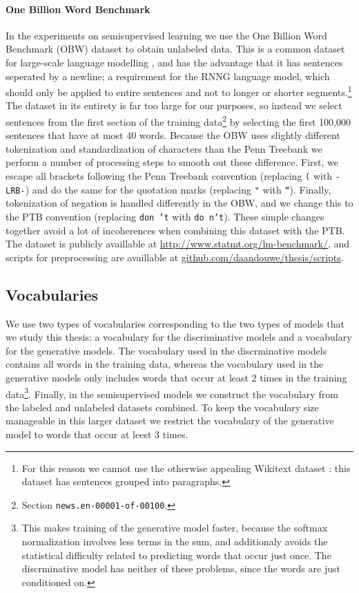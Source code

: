    \paragraph{One Billion Word Benchmark}
    In the experiments on semisupervised learning we use the One Billion Word Benchmark (OBW) dataset \citep{chelba2013one} to obtain unlabeled data. This is a common dataset for large-scale language modelling \citep{jozefowicz2016exploring}, and has the advantage that it has sentences seperated by a newline; a requirement for the RNNG language model, which should only be applied to entire sentences and not to longer or shorter segments.\footnote{For this reason we cannot use the otherwise appealing Wikitext dataset \citep{merity2016pointer}: this dataset has sentences grouped into paragraphs.} The dataset in its entirety is far too large for our purposes, so instead we select sentences from the first section of the training data\footnote{Section \texttt{news.en-00001-of-00100}.} by selecting the first 100,000 sentences that have at most 40 words. Because the OBW uses slightly different tokenization and standardization of characters than the Penn Treebank we perform a number of processing steps to smooth out these difference. First, we escape all brackets following the Penn Treebank convention (replacing \texttt{(} with \texttt{-LRB-}) and do the same for the quotation marks (replacing \texttt{"} with \texttt{``}). Finally, tokenization of negation is handled differently in the OBW, and we change this to the PTB convention (replacing \texttt{don 't} with \texttt{do n't}). These simple changes together avoid a lot of incoherences when combining this dataset with the PTB. The dataset is publicly availlable at \url{http://www.statmt.org/lm-benchmark/}, and scripts for preprocessing are availlable at \url{github.com/daandouwe/thesis/scripts}.

  \subsection{Vocabularies}
    We use two types of vocabularies corresponding to the two types of models that we study this thesis: a vocabulary for the discriminative models and a vocabulary for the generative models. The vocabulary used in the discrminative models contains all words in the training data, whereas the vocabulary used in the generative models only includes words that occur at least 2 times in the training data\footnote{This makes training of the generative model faster, because the softmax normalization involves less terms in the sum, and additionaly avoids the statistical difficulty related to predicting words that occur just once. The discrminative model has neither of these problems, since the words are just conditioned on.}. Finally, in the semisupervised models we construct the vocabulary from the labeled and unlabeled datasets combined. To keep the vocabulary size manageable in this larger dataset we restrict the vocabulary of the generative model to words that occur at leest 3 times.

